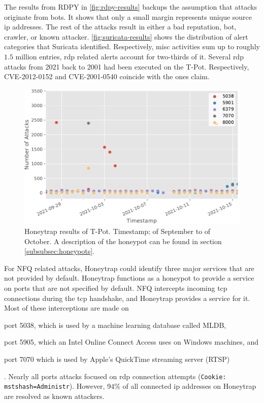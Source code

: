 The results from RDPY in \autoref{fig:rdpy-results} backups the assumption that attacks originate from bots.
It shows that only a small margin represents unique source \ac{ip} addresses.
The rest of the attacks result in either a bad reputation, bot, crawler, or known attacker.
\autoref{fig:suricata-results} shows the distribution of alert categories that Suricata identified.
Respectively, misc activities sum up to roughly $1.5$ million entries, \ac{rdp} related alerts account for two-thirds of it.
Several \ac{rdp} attacks from 2021 back to 2001 had been executed on the T-Pot.
Respectively, CVE-2012-0152 and CVE-2001-0540 coincide with the ones \citet{Kelly2021} claim.

\begin{figure}[htbp]
    \centering
    \includegraphics[width=\textwidth]{figures/tpot-honeytrap-port.pdf}
    \caption[Honeytrap results of T-Pot]{
        Honeytrap results of T-Pot.
        Timestamp;  of September to  of October.
        A description of the honeypot can be found in section \ref{subsubsec:honeypots}.
    }
    \label{fig:honeytrap-results}
\end{figure}

For NFQ related attacks, Honeytrap could identify three major services that are not provided by default.
Honeytrap functions as a honeypot to provide a service on ports that are not specified by default.
NFQ intercepts incoming \ac{tcp} connections during the \ac{tcp} handshake, and Honeytrap provides a service for it.
Most of these interceptions are made on
\begin{enumerate*}[label=(\roman*)]
    \item port 5038, which is used by a machine learning database called MLDB,
    \item port 5905, which an Intel Online Connect Access uses on Windows machines, and
    \item port 7070 which is used by Apple's QuickTime streaming server (RTSP)
\end{enumerate*}.
Nearly all ports attacks focused on \ac{rdp} connection attempts (\verb|Cookie: mstshash=Administr|).
However, $94\%$ of all connected \ac{ip} addresses on Honeytrap are resolved as known attackers.

